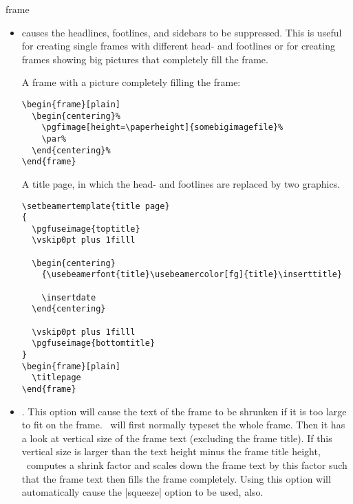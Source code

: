 \begin{environment}{{frame}%
    }
\begin{frame}[<+->][plain]
\begin{frame}[plain]
\begin{itemize}
    Furthermore, on each slide of the frame a label with the name
    |<||>| is created. On the
    \emph{first} slide, furthermore, a label with the name 
    is created (so the labels  and |<1>| point
    to the same slide). Note that labels in general, and these labels
    in particular, can be used as targets for hyperlinks.
  \item
     causes  the headlines, footlines,
    and sidebars to be suppressed. This is useful for creating single
    frames with different head- and footlines or for creating frames
    showing big pictures that completely fill the frame.

  \example A frame with a picture completely filling the frame:  
\begin{verbatim}
\begin{frame}[plain]
  \begin{centering}%
    \pgfimage[height=\paperheight]{somebigimagefile}%
    \par%
  \end{centering}%
\end{frame}
\end{verbatim}
  
  \example A title page, in which the head- and footlines are replaced
  by two graphics.
\begin{verbatim}
\setbeamertemplate{title page}
{
  \pgfuseimage{toptitle}
  \vskip0pt plus 1filll

  \begin{centering}
    {\usebeamerfont{title}\usebeamercolor[fg]{title}\inserttitle}
    
    \insertdate
  \end{centering}

  \vskip0pt plus 1filll
  \pgfuseimage{bottomtitle}
}
\begin{frame}[plain]
  \titlepage
\end{frame}
\end{verbatim}
  \item
    . This
    option will cause the text of the frame to be shrunken if it is
    too large to fit on the frame. \beamer\ will first normally
    typeset the whole frame. Then it has a look at vertical size of
    the frame text (excluding the frame title). If this vertical size
    is larger than  the text height minus the frame title height,
    \beamer\ computes a shrink factor and scales down the frame text
    by this factor such that the frame text then fills the frame
    completely. Using this option will automatically cause the
    |squeeze| option to be used, also.


\end{itemize}
\end{frame}
\end{frame}
\end{environment}
